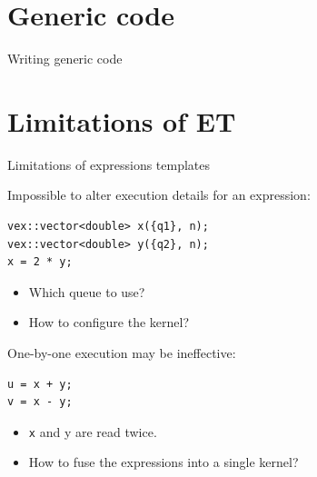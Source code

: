 \documentclass[@BEAMER_OPTIONS@]{beamer}
\newcommand{\code}[1]{\lstinline|#1|}
\begin{document}
\section{Generic code}

\begin{frame}{Writing generic code}
\end{frame}

\section{Limitations of ET}

\begin{frame}[fragile]{Limitations of expressions templates}
    \begin{exampleblock}{Impossible to alter execution details for an expression:}
        \begin{lstlisting}
vex::vector<double> x({q1}, n);
vex::vector<double> y({q2}, n);
x = 2 * y;
        \end{lstlisting}
    \end{exampleblock}
    \begin{itemize}
        \item Which queue to use?
        \item How to configure the kernel?
    \end{itemize}

    \vspace{\baselineskip}

    \begin{exampleblock}{One-by-one execution may be ineffective:}
        \begin{lstlisting}
u = x + y;
v = x - y;
        \end{lstlisting}
    \end{exampleblock}
    \begin{itemize}
        \item \code{x} and {y} are read twice.
        \item How to fuse the expressions into a single kernel?
    \end{itemize}
\end{frame}

\note{}
\end{document}
